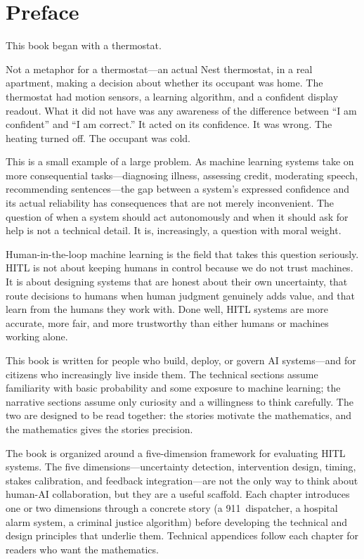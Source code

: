 
\chapter*{Preface}

\noindent This book began with a thermostat.

Not a metaphor for a thermostat---an actual Nest thermostat, in a real apartment, making a decision about whether its occupant was home. The thermostat had motion sensors, a learning algorithm, and a confident display readout. What it did not have was any awareness of the difference between ``I am confident'' and ``I am correct.'' It acted on its confidence. It was wrong. The heating turned off. The occupant was cold.

This is a small example of a large problem. As machine learning systems take on more consequential tasks---diagnosing illness, assessing credit, moderating speech, recommending sentences---the gap between a system's expressed confidence and its actual reliability has consequences that are not merely inconvenient. The question of when a system should act autonomously and when it should ask for help is not a technical detail. It is, increasingly, a question with moral weight.

Human-in-the-loop machine learning is the field that takes this question seriously. HITL is not about keeping humans in control because we do not trust machines. It is about designing systems that are honest about their own uncertainty, that route decisions to humans when human judgment genuinely adds value, and that learn from the humans they work with. Done well, HITL systems are more accurate, more fair, and more trustworthy than either humans or machines working alone.

\medskip

This book is written for people who build, deploy, or govern AI systems---and for citizens who increasingly live inside them. The technical sections assume familiarity with basic probability and some exposure to machine learning; the narrative sections assume only curiosity and a willingness to think carefully. The two are designed to be read together: the stories motivate the mathematics, and the mathematics gives the stories precision.

The book is organized around a five-dimension framework for evaluating HITL systems. The five dimensions---uncertainty detection, intervention design, timing, stakes calibration, and feedback integration---are not the only way to think about human-AI collaboration, but they are a useful scaffold. Each chapter introduces one or two dimensions through a concrete story (a 911~dispatcher, a hospital alarm system, a criminal justice algorithm) before developing the technical and design principles that underlie them. Technical appendices follow each chapter for readers who want the mathematics.

